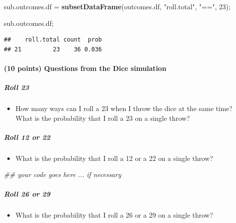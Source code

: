 \documentclass[
]{article}
\newenvironment{Shaded}{\begin{snugshade}}{\end{snugshade}}
\newcommand{\CommentTok}[1]{\textcolor[rgb]{0.56,0.35,0.01}{\textit{#1}}}
\newcommand{\DecValTok}[1]{\textcolor[rgb]{0.00,0.00,0.81}{#1}}
\newcommand{\KeywordTok}[1]{\textcolor[rgb]{0.13,0.29,0.53}{\textbf{#1}}}
\newcommand{\NormalTok}[1]{#1}
\newcommand{\StringTok}[1]{\textcolor[rgb]{0.31,0.60,0.02}{#1}}
\providecommand{\tightlist}{%
  \setlength{\itemsep}{0pt}\setlength{\parskip}{0pt}}
\begin{document}
\begin{Shaded}
\begin{Highlighting}[]
\NormalTok{sub.outcomes.df =}\StringTok{ }\KeywordTok{subsetDataFrame}\NormalTok{(outcomes.df, }\StringTok{"roll.total"}\NormalTok{, }\StringTok{"=="}\NormalTok{, }\DecValTok{23}\NormalTok{);}

\NormalTok{sub.outcomes.df;}
\end{Highlighting}
\end{Shaded}

\begin{verbatim}
##    roll.total count  prob
## 21         23    36 0.036
\end{verbatim}

\hypertarget{points-questions-from-the-dice-simulation}{%
\paragraph{(10 points) Questions from the Dice
simulation}\label{points-questions-from-the-dice-simulation}}

\hypertarget{roll-23}{%
\subparagraph{\texorpdfstring{\textbf{Roll
23}}{Roll 23}}\label{roll-23}}

\begin{itemize}
\tightlist
\item
  How many ways can I roll a 23 when I throw the dice at the same time?
  What is the probability that I roll a 23 on a single throw?
\end{itemize}

\hypertarget{roll-12-or-22}{%
\subparagraph{\texorpdfstring{\textbf{Roll 12 or
22}}{Roll 12 or 22}}\label{roll-12-or-22}}

\begin{itemize}
\tightlist
\item
  What is the probability that I roll a 12 or a 22 on a single throw?
\end{itemize}

\begin{Shaded}
\begin{Highlighting}[]
\CommentTok{\#\# your code goes here ... if necessary}
\end{Highlighting}
\end{Shaded}

\hypertarget{roll-26-or-29}{%
\subparagraph{\texorpdfstring{\textbf{Roll 26 or
29}}{Roll 26 or 29}}\label{roll-26-or-29}}

\begin{itemize}
\tightlist
\item
  What is the probability that I roll a 26 or a 29 on a single throw?
\end{itemize}
\end{document}
